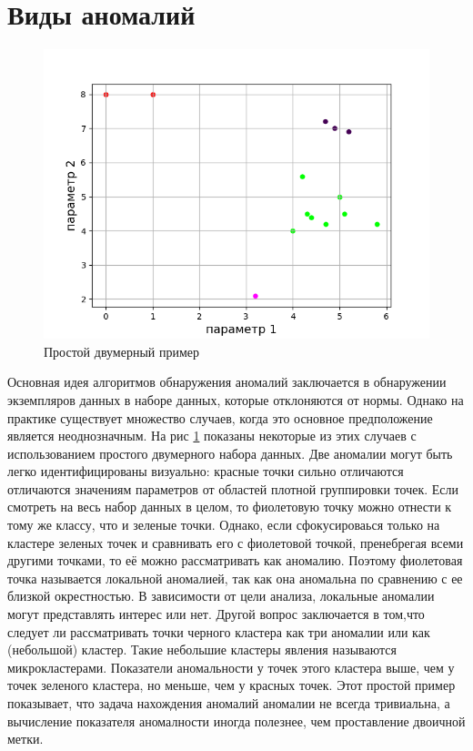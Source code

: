\section{Виды аномалий}
\begin{figure}
	\centering
	\includegraphics[width=.5\textwidth]{img/1.png}
	\caption{Простой двумерный пример}
	\label{fig01}
\end{figure}

Основная идея алгоритмов обнаружения аномалий заключается в обнаружении экземпляров данных в наборе данных, которые отклоняются от нормы. Однако на практике существует множество случаев, когда это основное предположение является неоднозначным. На рис \ref{fig01} показаны некоторые из этих случаев с использованием простого двумерного набора данных. Две аномалии могут быть легко идентифицированы визуально: красные точки  сильно отличаются отличаются значениям параметров от областей плотной группировки точек. Если смотреть на весь набор данных в целом, то фиолетовую точку можно отнести к тому же классу, что и зеленые точки.  Однако, если сфокусироваься только на кластере зеленых точек и сравнивать его с фиолетовой точкой, пренебрегая всеми другими точками, то её можно рассматривать как аномалию. Поэтому фиолетовая точка называется локальной аномалией, так как она аномальна по сравнению с ее близкой окрестностью. В зависимости от цели анализа, локальные  аномалии могут представлять интерес или нет. 
Другой  вопрос  заключается в том,что следует ли рассматривать точки черного кластера  как три аномалии или как (небольшой) кластер. Такие небольшие кластеры явления называются микрокластерами. Показатели аномальности у точек этого кластера выше, чем  у точек зеленого кластера, но меньше, чем  у красных точек. Этот простой пример  показывает, что задача нахождения аномалий аномалии не всегда тривиальна, а вычисление показателя аномалности иногда полезнее, чем проставление двоичной метки.


